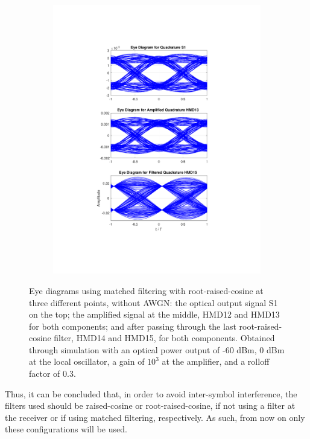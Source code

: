 \begin{figure}[H]
\begin{subfigure}{.45\textwidth}
		\includegraphics[clip, trim=5cm 4cm 5cm 4cm,
			width=\textwidth]{./sdf/m_qam_system/figures/eyes/q_nn_p_60_03.pdf}
	\end{subfigure}
	
	\caption{Eye diagrams using matched filtering with root-raised-cosine
		at three different points, without AWGN: the optical output signal S1 on the
		top; the amplified signal at the middle, HMD12 and HMD13 for both components;
		and after passing through the last root-raised-cosine filter, HMD14 and HMD15,
		for both components. Obtained through simulation with an optical power output
		of -60 dBm, 0 dBm at the local oscillator, a gain of $10^3$ at the amplifier,
		and a rolloff factor of 0.3.\label{fig:eyes_nn_rrc_03}}
	
\end{figure}

Thus, it can be concluded that, in order to avoid inter-symbol interference,
the filters used should be raised-cosine or root-raised-cosine, if not using a
filter at the receiver or if using matched filtering, respectively. As such,
from now on only these configurations will be used.

